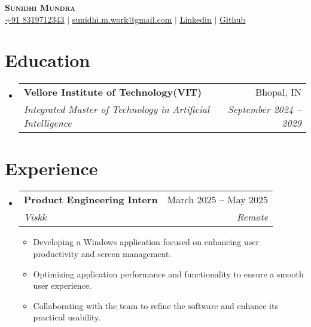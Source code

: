 \documentclass[letterpaper,11pt]{article}
\makeatletter
\newcommand{\resumeItem}[1]{
  \item\small{
    {#1 \vspace{-2pt}}
  }
}
\newcommand{\resumeSubheading}[4]{
  \vspace{-2pt}\item
    \begin{tabular*}{0.97\textwidth}[t]{l@{\extracolsep{\fill}}r}
      \textbf{#1} & #2 \\
      \textit{\small#3} & \textit{\small #4} \\
    \end{tabular*}\vspace{-7pt}
}
\newcommand{\resumeSubHeadingListStart}{\begin{itemize}[leftmargin=0.15in, label={}]}
\newcommand{\resumeSubHeadingListEnd}{\end{itemize}}
\newcommand{\resumeItemListStart}{\begin{itemize}}
\newcommand{\resumeItemListEnd}{\end{itemize}\vspace{-5pt}}
\makeatother
\begin{document}
\begin{center}
    \textbf{\Huge \scshape Sunidhi Mundra} \\ \vspace{1pt}
    \href{tel:+918319712343}{\underline{+91 8319712343}} $|$ 
    \href{mailto:sunidhi.m.work@gmail.com}{\underline{sunidhi.m.work@gmail.com}} $|$ 
    \href{https://www.linkedin.com/in/sunidhi-mundra}{\underline{Linkedin}} $|$
    \href{https://github.com/foundsunidhi}{\underline{Github}}
\end{center}

\section{Education}
  \resumeSubHeadingListStart
    \resumeSubheading
      {Vellore Institute of Technology(VIT) }{Bhopal, IN}
      {Integrated Master of Technology in Artificial Intelligence}{September 2024 -- 2029}
  \resumeSubHeadingListEnd

\section{Experience}
  \resumeSubHeadingListStart
   \resumeSubheading
      {Product Engineering Intern}{March 2025 -- May 2025}
      {Viskk}{Remote}
      \resumeItemListStart
       \resumeItem{Developing a Windows application focused on enhancing user productivity and screen management.}
        \resumeItem{Optimizing application performance and functionality to ensure a smooth user experience.}
        \resumeItem{Collaborating with the team to refine the software and enhance its practical usability.}
      \resumeItemListEnd
  \resumeSubHeadingListEnd

\end{document}
